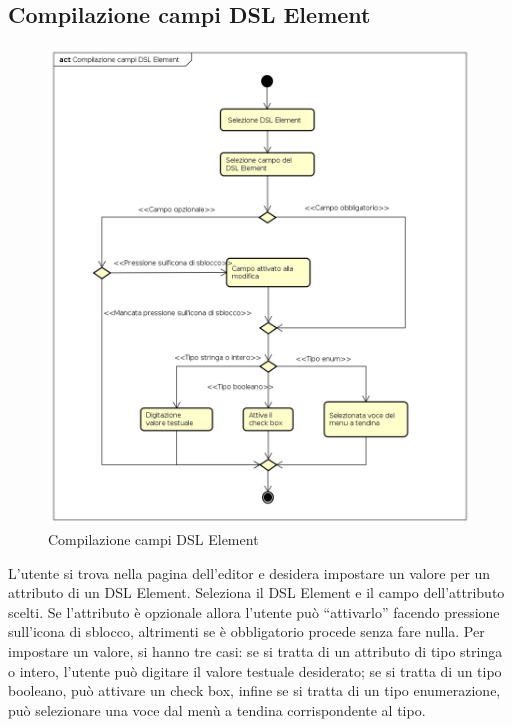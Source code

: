     \subsection{Compilazione campi DSL Element}
    \begin{figure}[H]
      \centering
      \includegraphics[width=1.1\textwidth]{res/img/compilazioneCampi.png}
      \caption{Compilazione campi DSL Element}
      \label{fig:diagram_model}
    \end{figure}
    L'utente si trova nella pagina dell'editor e desidera impostare un valore per un attributo di un DSL Element. Seleziona il DSL Element e il campo dell'attributo scelti. Se l'attributo è opzionale allora l'utente può ``attivarlo'' facendo pressione sull'icona di sblocco, altrimenti se è obbligatorio procede senza fare nulla. Per impostare un valore, si hanno tre casi: se si tratta di un attributo di tipo stringa o intero, l'utente può digitare il valore testuale desiderato; se si tratta di un tipo booleano, può attivare un check box, infine se si tratta di un tipo enumerazione, può selezionare una voce dal menù a tendina corrispondente al tipo.
